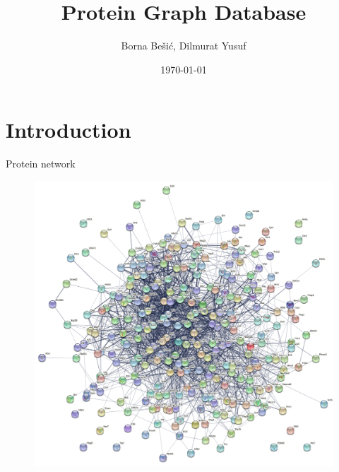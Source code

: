 \documentclass{beamer}
\title[Protein Graph DB]{ Protein Graph Database } %
\author{ Borna Bešić, Dilmurat Yusuf } %
\institute[] %
{
Bioinformatics Group \\
\medskip
Albert-Ludwigs-Universität, Freiburg  %
}
\date{\today} %
\begin{document}
\begin{frame}
\titlepage %
\end{frame}



\section{Introduction} %

\begin{frame}{Protein network}
\begin{figure}
    \centering
    \includegraphics[width=0.55\linewidth]{protein_network_example.png}
\end{figure}

\end{frame}
\end{document}
